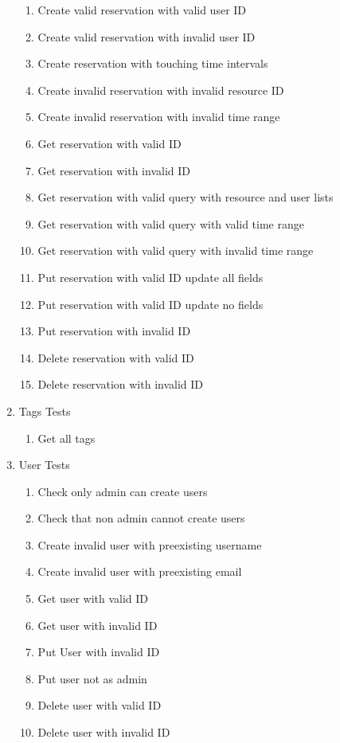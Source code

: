 \documentclass[12pt]{article}
\begin{document}
\begin{enumerate}
	\begin{enumerate}
		\item Create valid reservation with valid user ID
		\item Create valid reservation with invalid user ID
		\item Create reservation with touching time intervals
		\item Create invalid reservation with invalid resource ID
		\item Create invalid reservation with invalid time range
		\item Get reservation with valid ID
		\item Get reservation with invalid ID
		\item Get reservation with valid query with resource and user lists
		\item Get reservation with valid query with valid time range
		\item Get reservation with valid query with invalid time range
		\item Put reservation with valid ID update all fields
		\item Put reservation with valid ID update no fields
		\item Put reservation with invalid ID
		\item Delete reservation with valid ID
		\item Delete reservation with invalid ID
	\end{enumerate}
	\item Tags Tests
	\begin{enumerate}
		\item Get all tags
	\end{enumerate}
	\item User Tests
	\begin{enumerate}
		\item Check only admin can create users
		\item Check that non admin cannot create users
		\item Create invalid user with preexisting username
		\item Create invalid user with preexisting email 
		\item Get user with valid ID
		\item Get user with invalid ID
		\item Put User with invalid ID
		\item Put user not as admin
		\item Delete user with valid ID
		\item Delete user with invalid ID
	\end{enumerate}
\end{enumerate}
\end{document}

